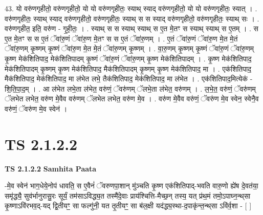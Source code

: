 \documentclass[17pt]{extarticle}
\begin{document}
43. यो वरु॑णगृहीतो॒ वरु॑णगृहीतो॒ यो यो वरु॑णगृहीतः॒ स्याथ् स्याद् वरु॑णगृहीतो॒ यो यो वरु॑णगृहीतः॒ स्यात् । . वरु॑णगृहीतः॒ स्याथ् स्याद् वरु॑णगृहीतो॒ वरु॑णगृहीतः॒ स्याथ् स स स्याद् वरु॑णगृहीतो॒ वरु॑णगृहीतः॒ स्याथ् सः । . वरु॑णगृहीत॒ इति॒ वरु॑ण - गृ॒ही॒तः॒ । . स्याथ् स स स्याथ् स्याथ् स ए॒त मे॒तꣳ स स्याथ् स्याथ् स ए॒तम् । . स ए॒त मे॒तꣳ स स ए॒तं ॅवा॑रु॒णं ॅवा॑रु॒ण मे॒तꣳ स स ए॒तं ॅवा॑रु॒णम् । . ए॒तं ॅवा॑रु॒णं ॅवा॑रु॒ण मे॒त मे॒तं ॅवा॑रु॒णम् कृ॒ष्णम् कृ॒ष्णं ॅवा॑रु॒ण मे॒त मे॒तं ॅवा॑रु॒णम् कृ॒ष्णम् । . वा॒रु॒णम् कृ॒ष्णम् कृ॒ष्णं ॅवा॑रु॒णं ॅवा॑रु॒णम् कृ॒ष्ण मेक॑शितिपाद॒ मेक॑शितिपादम् कृ॒ष्णं ॅवा॑रु॒णं ॅवा॑रु॒णम् कृ॒ष्ण मेक॑शितिपादम् । . कृ॒ष्ण मेक॑शितिपाद॒ मेक॑शितिपादम् कृ॒ष्णम् कृ॒ष्ण मेक॑शितिपाद॒ मैक॑शितिपादम् कृ॒ष्णम् कृ॒ष्ण मेक॑शितिपाद॒ मा । . एक॑शितिपाद॒ मैक॑शितिपाद॒ मेक॑शितिपाद॒ मा ल॑भेत लभे॒ तैक॑शितिपाद॒ मेक॑शितिपाद॒ मा ल॑भेत । . एक॑शितिपाद॒मित्येक॑ - शि॒ति॒पा॒द॒म् । . आ ल॑भेत लभे॒ता ल॑भेत॒ वरु॑णं॒ ॅवरु॑णम् ॅलभे॒ता ल॑भेत॒ वरु॑णम् । . ल॒भे॒त॒ वरु॑णं॒ ॅवरु॑णम् ॅलभेत लभेत॒ वरु॑ण मे॒वैव वरु॑णम् ॅलभेत लभेत॒ वरु॑ण मे॒व । . वरु॑ण मे॒वैव वरु॑णं॒ ॅवरु॑ण मे॒व स्वेन॒ स्वेनै॒व वरु॑णं॒ ॅवरु॑ण मे॒व स्वेन॑ । \newline
\pagebreak
{}
\section*{ TS 2.1.2.2 }

\textbf{TS 2.1.2.2 } \newline
\textbf{Samhita Paata} \newline

-मे॒व स्वेन॑ भाग॒धेये॒नोप॑ धावति॒ स ए॒वैनं॑ ॅवरुणपा॒शान् मु॑ञ्चति कृ॒ष्ण एक॑शितिपाद्-भवति वारु॒णो ह्ये॑ष दे॒वत॑या॒ समृ॑द्ध्यै॒ सुव॑र्भानुरासु॒रः सूर्यं॒ तम॑साऽविद्ध्य॒त तस्मै॑दे॒वाः प्राय॑श्चित्ति-मैच्छ॒न् तस्य॒ यत् प्र॑थ॒मं तमो॒ऽपाघ्न॒न्थ्‌सा कृ॒ष्णाऽवि॑रभव॒द्-यद् द्वि॒तीयꣳ॒॒ सा फल्गु॑नी॒ यत तृ॒तीयꣳ॒॒ सा ब॑ल॒क्षी यद॑द्ध्य॒स्था-द॒पाकृ॑न्त॒न्थ्‌सा ऽवि॑र्व॒शा - [  ] \newline
\end{document}
